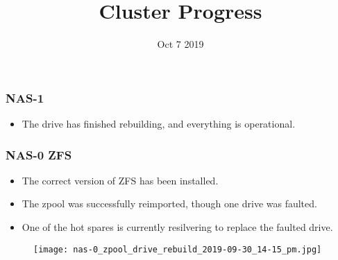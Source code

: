 \documentclass{beamer}
\title{Cluster Progress}
\date{Oct 7 2019}
\begin{document}

\begin{frame}
  \maketitle
\end{frame}



\begin{frame}
  \frametitle{NAS-1}

  \begin{itemize}
  \item The drive has finished rebuilding, and everything is operational.
  \end{itemize}

\end{frame}

\begin{frame}
  \frametitle{NAS-0 ZFS}

  \begin{itemize}
  \item The correct version of ZFS has been installed.

  \item The zpool was successfully reimported, though one drive was faulted.

  \item One of the hot spares is currently resilvering to replace the faulted drive.
  \end{itemize}

  \begin{figure}[H]
    \begin{center}
      \texttt{[image: nas-0\_zpool\_drive\_rebuild\_2019-09-30\_14-15\_pm.jpg]}
    \end{center}
      \end{figure}

\end{frame}
\end{document}
